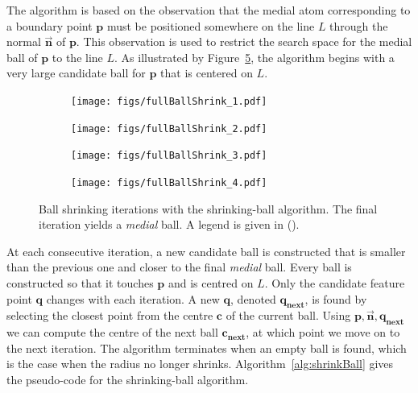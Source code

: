 The algorithm is based on the observation that the medial atom corresponding to a boundary point $\mathbf{p}$ must be positioned somewhere on the line $L$ through the normal $\vec{\mathbf{n}}$ of $\mathbf{p}$.
This observation is used to restrict the search space for the medial ball of $\mathbf{p}$ to the line $L$.
As illustrated by Figure~\ref{fig:shrinkballAlgo}, the algorithm begins with a very large candidate ball for $\mathbf{p}$ that is centered on $L$.
\begin{figure}[tbp]
	\begin{subfigure}{0.245\linewidth}
		\texttt{[image: figs/fullBallShrink\_1.pdf]}
		\label{fig:fullBallShrink_1}
	\end{subfigure}
	\begin{subfigure}{0.245\linewidth}
		\texttt{[image: figs/fullBallShrink\_2.pdf]}
		\label{fig:fullBallShrink_2}
	\end{subfigure}
	\begin{subfigure}{0.245\linewidth}
		\texttt{[image: figs/fullBallShrink\_3.pdf]}
		\label{fig:fullBallShrink_3}
	\end{subfigure}
	\begin{subfigure}{0.245\linewidth}
		\texttt{[image: figs/fullBallShrink\_4.pdf]}
		\label{fig:fullBallShrink_4}
	\end{subfigure}
	\caption[Ball shrinking iterations with the shrinking-ball algorithm]{Ball shrinking iterations with the shrinking-ball algorithm. The final iteration yields a \emph{medial} ball. A legend is given in ().}%
	\label{fig:shrinkballAlgo}
\end{figure}
At each consecutive iteration, a new candidate ball is constructed that is smaller than the previous one and closer to the final \emph{medial} ball.
Every ball is constructed so that it touches $\mathbf{p}$ and is centred on $L$.
Only the candidate feature point $\mathbf{q}$ changes with each iteration.
A new $\mathbf{q}$, denoted $\mathbf{q_{next}}$, is found by selecting the closest point from the centre $\mathbf{c}$ of the current ball.
Using $\mathbf{p}, \vec{\mathbf{n}}, \mathbf{q_{next}}$ we can compute the centre of the next ball $\mathbf{c_{next}}$, at which point we move on to the next iteration.
The algorithm terminates when an empty ball is found, which is the case when the radius no longer shrinks.
Algorithm~\ref{alg:shrinkBall} gives the pseudo-code for the shrinking-ball algorithm.
